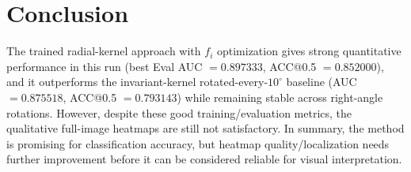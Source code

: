\documentclass{article}
\begin{document}
\section*{Conclusion}
The trained radial-kernel approach with $f_i$ optimization gives strong quantitative performance in this run (best Eval AUC $=0.897333$, ACC@0.5 $=0.852000$), and it outperforms the invariant-kernel rotated-every-$10^\circ$ baseline (AUC $=0.875518$, ACC@0.5 $=0.793143$) while remaining stable across right-angle rotations. However, despite these good training/evaluation metrics, the qualitative full-image heatmaps are still not satisfactory. In summary, the method is promising for classification accuracy, but heatmap quality/localization needs further improvement before it can be considered reliable for visual interpretation.
\end{document}
